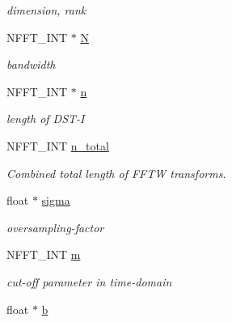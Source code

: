 \begin{DoxyCompactItemize}
\begin{DoxyCompactList}\small\item\em dimension, rank \end{DoxyCompactList}\item 
\hypertarget{structnfstf__plan_ae4ac5a9d3488b538c556ecd5a72998f7}{N\-F\-F\-T\-\_\-\-I\-N\-T $\ast$ \hyperlink{structnfstf__plan_ae4ac5a9d3488b538c556ecd5a72998f7}{N}}\label{structnfstf__plan_ae4ac5a9d3488b538c556ecd5a72998f7}

\begin{DoxyCompactList}\small\item\em bandwidth \end{DoxyCompactList}\item 
\hypertarget{structnfstf__plan_a53bb7d52caf1c31898d06ada1077897c}{N\-F\-F\-T\-\_\-\-I\-N\-T $\ast$ \hyperlink{structnfstf__plan_a53bb7d52caf1c31898d06ada1077897c}{n}}\label{structnfstf__plan_a53bb7d52caf1c31898d06ada1077897c}

\begin{DoxyCompactList}\small\item\em length of D\-S\-T-\/\-I \end{DoxyCompactList}\item 
N\-F\-F\-T\-\_\-\-I\-N\-T \hyperlink{structnfstf__plan_a983d3aaa791b1bdb66e35d78e1c6b7ef}{n\-\_\-total}
\begin{DoxyCompactList}\small\item\em Combined total length of F\-F\-T\-W transforms. \end{DoxyCompactList}\item 
\hypertarget{structnfstf__plan_a8d8b3093a73c09aac44cd8f55708ef27}{float $\ast$ \hyperlink{structnfstf__plan_a8d8b3093a73c09aac44cd8f55708ef27}{sigma}}\label{structnfstf__plan_a8d8b3093a73c09aac44cd8f55708ef27}

\begin{DoxyCompactList}\small\item\em oversampling-\/factor \end{DoxyCompactList}\item 
\hypertarget{structnfstf__plan_a47ae136c974df2613f8b384e2764936d}{N\-F\-F\-T\-\_\-\-I\-N\-T \hyperlink{structnfstf__plan_a47ae136c974df2613f8b384e2764936d}{m}}\label{structnfstf__plan_a47ae136c974df2613f8b384e2764936d}

\begin{DoxyCompactList}\small\item\em cut-\/off parameter in time-\/domain \end{DoxyCompactList}\item 
\hypertarget{structnfstf__plan_a2ca69cf1b6dea39e81cba93d0d1667d8}{float $\ast$ \hyperlink{structnfstf__plan_a2ca69cf1b6dea39e81cba93d0d1667d8}{b}}\label{structnfstf__plan_a2ca69cf1b6dea39e81cba93d0d1667d8}


\end{DoxyCompactItemize}

